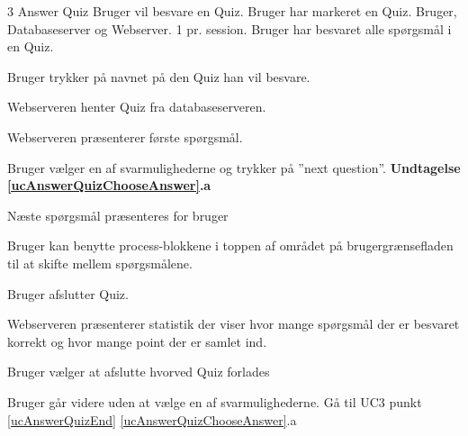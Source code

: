 \uchead
	{3}
	{Answer Quiz}
	{Bruger vil besvare en Quiz.}
	{Bruger har markeret en Quiz.}
	{Bruger, Databaseserver og Webserver.}
	{}
	{1 pr. session.}
	{Bruger har besvaret alle spørgsmål i en Quiz.}

\item Bruger trykker på navnet på den Quiz han vil besvare.

\item Webserveren henter Quiz fra databaseserveren.

\item\label{ucAnswerQuizPresent} Webserveren præsenterer første spørgsmål.

\item \label{ucAnswerQuizChooseAnswer} Bruger vælger en af svarmulighederne og trykker på ''next question''. 
\textbf{Undtagelse \ref{ucAnswerQuizChooseAnswer}.a}


\item\label{ucAnswerQuizEnd} Næste spørgsmål præsenteres for bruger 


\item Bruger kan benytte process-blokkene i toppen af området på brugergrænsefladen til at skifte mellem spørgsmålene.

\item Bruger afslutter Quiz.


\item Webserveren præsenterer statistik der viser hvor mange spørgsmål der er besvaret korrekt og hvor mange point der er samlet ind.

\item Bruger vælger at afslutte hvorved Quiz forlades

\ucdescriptionend

\ucextension
	{Bruger går videre uden at vælge en af svarmulighederne.}
	{Gå til UC3 punkt \ref{ucAnswerQuizEnd}}
	{\ref{ucAnswerQuizChooseAnswer}.a}
	

